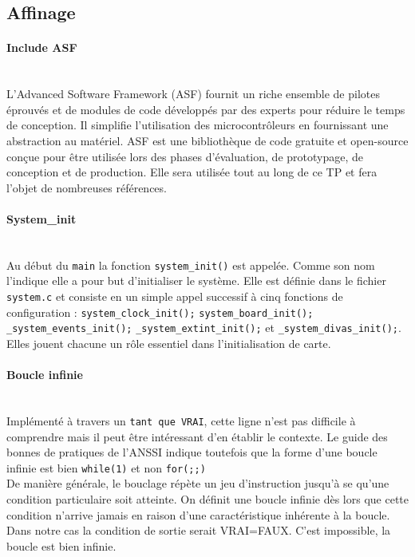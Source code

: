 \documentclass[a4paper]{article}
\begin{document}
	\subsection{Affinage}
	
	\paragraph{Include ASF}
	~~\\
	L'Advanced Software Framework (ASF) fournit un riche ensemble de pilotes éprouvés et de modules de code développés par des experts pour réduire le temps de conception. Il simplifie l'utilisation des microcontrôleurs en fournissant une abstraction au matériel. ASF est une bibliothèque de code gratuite et open-source conçue pour être utilisée lors des phases d'évaluation, de prototypage, de conception et de production. Elle sera utilisée tout au long de ce TP et fera l'objet de nombreuses références.
	
	\paragraph{System\_init}
	~~\\
	Au début du \texttt{main} la fonction \texttt{system\_init()} est appelée. Comme son nom l'indique elle a pour but d'initialiser le système. Elle est définie dans le fichier \texttt{system.c} et consiste en un simple appel successif à cinq fonctions de configuration : 	 
	\texttt{system\_clock\_init();}
	\texttt{system\_board\_init();}
	\texttt{\_system\_events\_init();}
	\texttt{\_system\_extint\_init();}
	et  \texttt{\_system\_divas\_init();}.
	Elles jouent chacune un rôle essentiel dans l'initialisation de carte.
	
	\paragraph{Boucle infinie}
	~~\\
	Implémenté à travers un \texttt{tant que VRAI}, cette ligne n'est pas difficile à comprendre mais il peut être intéressant d'en établir le contexte. Le guide des bonnes de pratiques de l'ANSSI\cite{ANSSI2021} indique toutefois que la forme d'une boucle infinie est bien \texttt{while(1)} et non \texttt{for(;;)}\\
	De manière générale, le bouclage répète un jeu d'instruction jusqu'à se qu'une condition particulaire soit atteinte. On définit une boucle infinie dès lors que cette condition n'arrive jamais en raison d'une caractéristique inhérente à la boucle. Dans notre cas la condition de sortie serait VRAI=FAUX. C'est impossible, la boucle est bien infinie.
	
\end{document}

